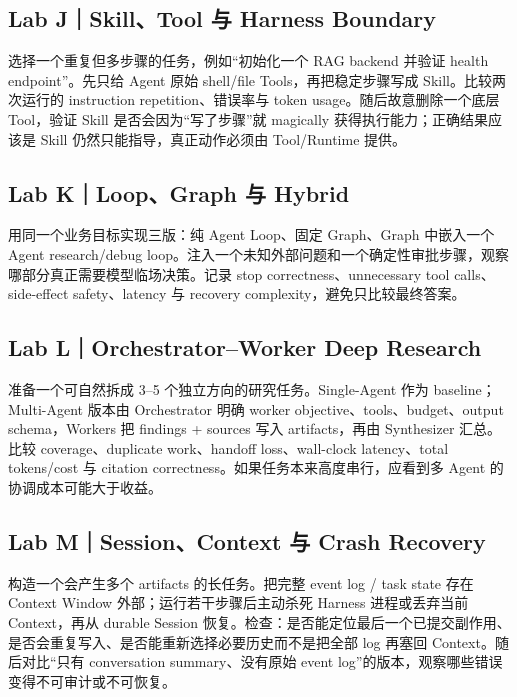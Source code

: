 \documentclass[profile=standard,twoside=false]{ipara-handbook}
\begin{document}
\subsection{Lab J｜Skill、Tool 与 Harness Boundary}

选择一个重复但多步骤的任务，例如“初始化一个 RAG backend 并验证 health endpoint”。先只给 Agent 原始 shell/file Tools，再把稳定步骤写成 Skill。比较两次运行的 instruction repetition、错误率与 token usage。随后故意删除一个底层 Tool，验证 Skill 是否会因为“写了步骤”就 magically 获得执行能力；正确结果应该是 Skill 仍然只能指导，真正动作必须由 Tool/Runtime 提供。

\subsection{Lab K｜Loop、Graph 与 Hybrid}

用同一个业务目标实现三版：纯 Agent Loop、固定 Graph、Graph 中嵌入一个 Agent research/debug loop。注入一个未知外部问题和一个确定性审批步骤，观察哪部分真正需要模型临场决策。记录 stop correctness、unnecessary tool calls、side-effect safety、latency 与 recovery complexity，避免只比较最终答案。

\subsection{Lab L｜Orchestrator--Worker Deep Research}

准备一个可自然拆成 3--5 个独立方向的研究任务。Single-Agent 作为 baseline；Multi-Agent 版本由 Orchestrator 明确 worker objective、tools、budget、output schema，Workers 把 findings + sources 写入 artifacts，再由 Synthesizer 汇总。比较 coverage、duplicate work、handoff loss、wall-clock latency、total tokens/cost 与 citation correctness。如果任务本来高度串行，应看到多 Agent 的协调成本可能大于收益。

\subsection{Lab M｜Session、Context 与 Crash Recovery}

构造一个会产生多个 artifacts 的长任务。把完整 event log / task state 存在 Context Window 外部；运行若干步骤后主动杀死 Harness 进程或丢弃当前 Context，再从 durable Session 恢复。检查：是否能定位最后一个已提交副作用、是否会重复写入、是否能重新选择必要历史而不是把全部 log 再塞回 Context。随后对比“只有 conversation summary、没有原始 event log”的版本，观察哪些错误变得不可审计或不可恢复。
\end{document}
